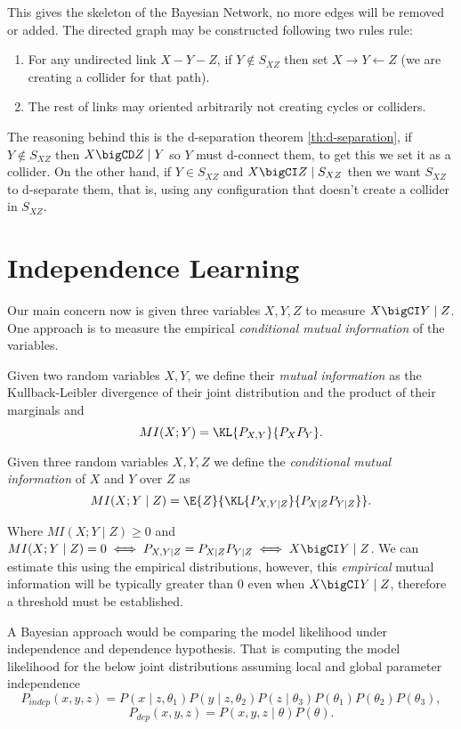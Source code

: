 This gives the skeleton of the Bayesian Network, no more edges will be removed or added. The directed graph may be constructed following two rules rule:
\begin{enumerate}
  \item For any undirected link \(X - Y - Z\), if \(Y \notin S_{XZ}\) then set
    \(X \to Y \leftarrow Z\) (we are creating a collider for that path).
  \item The rest of links may oriented arbitrarily not
creating cycles or colliders.
\end{enumerate}
The reasoning behind this is the
d-separation theorem \ref{th:d-separation},  if \(Y \notin S_{XZ}\) then \(X \bigCD Z \mid Y\) so \(Y\) must d-connect them, to get this we set it as a collider. On the other hand, if \(Y \in S_{XZ}\) and
\(X \bigCI Z \mid S_{XZ}\) then we want \(S_{XZ}\) to d-separate them, that is,
using any configuration that doesn't create a collider in \(S_{XZ}\).

\section{Independence Learning}

Our main concern now is given three variables \(X, Y, Z\) to measure \(X \bigCI Y \mid Z\). One approach is to measure the empirical \emph{conditional mutual information} of the variables.

\begin{definition}
  Given two random variables \(X, Y\), we define their \emph{mutual information} as the Kullback-Leibler divergence of their joint distribution and the product of their marginals and
  \[
    MI(X;Y) = \KL{P_{X,Y}}{P_{X}P_{Y}}.
  \]
\end{definition}

\begin{definition}
  Given three random variables \(X, Y, Z\) we define the \emph{conditional mutual information} of \(X\) and \(Y\) over \(Z\) as
  \[
    MI(X;Y\mid Z) = \E{Z}{\KL{P_{X,Y \mid Z}}{P_{X\mid Z} P_{Y \mid Z}}}.
  \]
\end{definition}
Where \(MI(X;Y \mid Z) \geq 0\) and \(MI(X;Y \mid Z) = 0 \iff P_{X,Y \mid Z} = P_{X\mid Z} P_{Y \mid Z} \iff X\bigCI Y \mid Z\). We can estimate this using the empirical distributions, however, this \emph{empirical} mutual information will be typically greater than \(0\) even when \(X\bigCI Y \mid Z\), therefore a threshold must be established.

A Bayesian approach would be comparing the model likelihood under independence and dependence hypothesis. That is computing the model likelihood for the below joint distributions assuming local and global parameter independence
\[
  P_{indep}(x,y,z) = P(x\mid z, \theta_{1})P(y \mid z, \theta_{2})P(z \mid \theta_{3})P(\theta_{1})P(\theta_{2})P(\theta_{3}),
\]
\[
P_{dep}(x,y,z) = P(x,y,z \mid \theta)P(\theta).
\]
